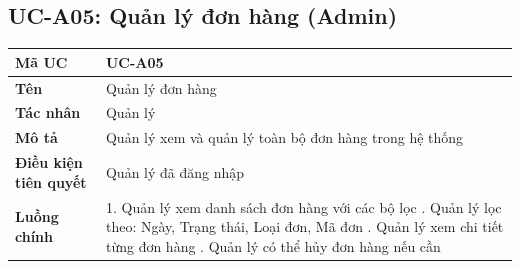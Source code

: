 \documentclass[../20232006p.tex]{subfiles}
\begin{document}
\subsection{UC-A05: Quản lý đơn hàng (Admin)}
\begin{table}[H]
    \centering
    \begin{tabular}{|p{3.5cm}|p{10cm}|}
        \hline
        \textbf{Mã UC}                & UC-A05                                                 \\
        \hline
        \textbf{Tên}                  & Quản lý đơn hàng                                       \\
        \hline
        \textbf{Tác nhân}             & Quản lý                                                \\
        \hline
        \textbf{Mô tả}                & Quản lý xem và quản lý toàn bộ đơn hàng trong hệ thống \\
        \hline
        \textbf{Điều kiện tiên quyết} & Quản lý đã đăng nhập                                   \\
        \hline
        \textbf{Luồng chính}          &
        1. Quản lý xem danh sách đơn hàng với các bộ lọc \newline
        2. Quản lý lọc theo: Ngày, Trạng thái, Loại đơn, Mã đơn \newline
        3. Quản lý xem chi tiết từng đơn hàng \newline
        4. Quản lý có thể hủy đơn hàng nếu cần                                                 \\
        \hline
    \end{tabular}
\end{table}
\end{document}
